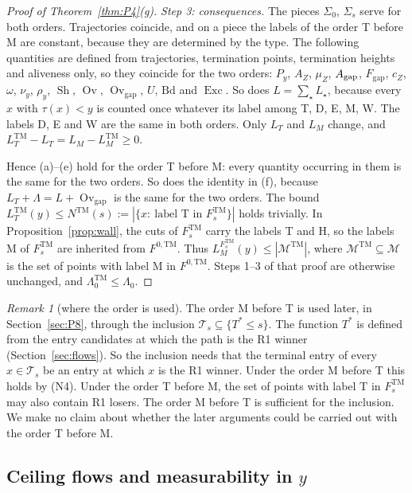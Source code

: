 \documentclass[11pt]{amsart}
\newcommand{\cM}{\mathcal M}
\newcommand{\cT}{\mathcal T}
\newcommand{\Sh}{\operatorname{Sh}}
\newcommand{\Ov}{\operatorname{Ov}}
\newcommand{\Ovgap}{\operatorname{Ov}_{\mathrm{gap}}}
\newcommand{\Fgap}{F_{\mathrm{gap}}}
\newcommand{\Exc}{\operatorname{Exc}}
\newcommand{\Lam}{\Lambda}
\theoremstyle{definition}
\theoremstyle{remark}
\newtheorem{remark}[theorem]{Remark}
\numberwithin{equation}{section}
\begin{document}
\begin{proof}[Proof of Theorem~\ref{thm:P4}(g)]
\emph{Step 3: consequences.} The pieces $\Sigma_0$, $\Sigma_s$ serve for both orders. Trajectories coincide, and on a piece the labels of the order T before M are constant, because they are determined by the type. The following quantities are defined from trajectories, termination points, termination heights and aliveness only, so they coincide for the two orders: $P_y$, $A_Z$, $\mu_Z$, $A_{\rm gap}$, $\Fgap$, $c_Z$, $\omega$, $\nu_y$, $\rho_y$, $\Sh$, $\Ov$, $\Ovgap$, $U$, $\mathrm{Bd}$ and $\Exc$. So does $L=\sum_\star L_\star$, because every $x$ with $\tau(x)<y$ is counted once whatever its label among T, D, E, M, W. The labels D, E and W are the same in both orders. Only $L_T$ and $L_M$ change, and $L^{\mathrm{TM}}_T-L_T=L_M-L^{\mathrm{TM}}_M\ge0$.

Hence (a)--(e) hold for the order T before M: every quantity occurring in them is the same for the two orders. So does the identity in (f), because $L_T+\Lam=L+\Ovgap$ is the same for the two orders. The bound $L^{\mathrm{TM}}_T(y)\le N^{\mathrm{TM}}(s):=|\{x:\ \text{label T in }F^{\mathrm{TM}}_s\}|$ holds trivially. In Proposition~\ref{prop:wall}, the cuts of $F^{\mathrm{TM}}_s$ carry the labels T and H, so the labels M of $F^{\mathrm{TM}}_s$ are inherited from $F^{0,\mathrm{TM}}$. Thus $L^{F^{\mathrm{TM}}_s}_M(y)\le|\cM^{\mathrm{TM}}|$, where $\cM^{\mathrm{TM}}\subseteq\cM$ is the set of points with label M in $F^{0,\mathrm{TM}}$. Steps 1--3 of that proof are otherwise unchanged, and $\Lam_0^{\mathrm{TM}}\le\Lam_0$.
\end{proof}

\begin{remark}[where the order is used]\label{rem:P4-order-used}
The order M before T is used later, in Section~\ref{sec:P8}, through the inclusion $\cT_s\subseteq\{T^*\le s\}$. The function $T^*$ is defined from the entry candidates at which the path is the R1 winner (Section~\ref{sec:flows}). So the inclusion needs that the terminal entry of every $x\in\cT_s$ be an entry at which $x$ is the R1 winner. Under the order M before T this holds by (N4). Under the order T before M, the set of points with label T in $F^{\mathrm{TM}}_s$ may also contain R1 losers. The order M before T is sufficient for the inclusion. We make no claim about whether the later arguments could be carried out with the order T before M.
\end{remark}

\subsection{Ceiling flows and measurability in \texorpdfstring{$y$}{y}}\label{ssec:P4-ceiling}
\end{document}
